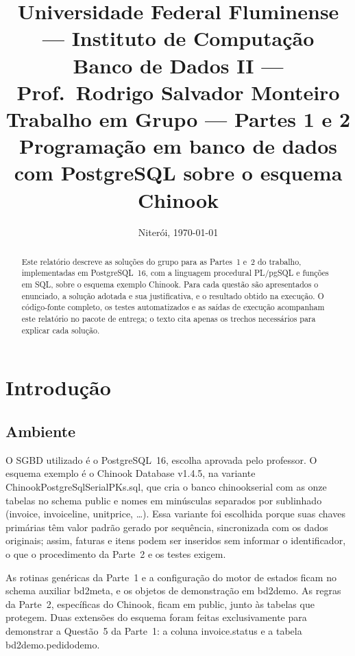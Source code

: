 \documentclass[11pt,a4paper]{article}
\title{%
  \normalsize Universidade Federal Fluminense --- Instituto de Computação\\
  Banco de Dados II --- Prof.\ Rodrigo Salvador Monteiro\\[2.5em]
  \LARGE Trabalho em Grupo --- Partes 1 e 2\\[0.4em]
  \large Programação em banco de dados com PostgreSQL sobre o esquema Chinook}
\author{\integrantes}
\date{Niterói, \today}
\newcommand{\cod}[1]{{\ttfamily\renewcommand{\_}{\textunderscore\allowbreak}#1}}
\begin{document}
\maketitle
\thispagestyle{empty}

\begin{abstract}
\noindent Este relatório descreve as soluções do grupo para as Partes~1 e~2 do trabalho, implementadas em
PostgreSQL~16, com a linguagem procedural PL/pgSQL e funções em SQL, sobre o esquema exemplo Chinook. Para cada questão são
apresentados o enunciado, a solução adotada e sua justificativa, e o resultado obtido na execução. O código-fonte
completo, os testes automatizados e as saídas de execução acompanham este relatório no pacote de entrega; o texto
cita apenas os trechos necessários para explicar cada solução.
\end{abstract}

\tableofcontents

\section{Introdução}

\subsection{Ambiente}

O SGBD utilizado é o PostgreSQL~16, escolha aprovada pelo professor. O esquema exemplo é o Chinook Database
v1.4.5, na variante \cod{Chinook\_PostgreSql\_SerialPKs.sql}, que cria o banco \cod{chinook\_serial} com as onze
tabelas no schema \cod{public} e nomes em minúsculas separados por sublinhado (\cod{invoice}, \cod{invoice\_line},
\cod{unit\_price}, \dots). Essa variante foi escolhida porque suas chaves primárias têm valor padrão gerado por
sequência, sincronizada com os dados originais; assim, faturas e itens podem ser inseridos sem informar o
identificador, o que o procedimento da Parte~2 e os testes exigem.

As rotinas genéricas da Parte~1 e a configuração do motor de estados ficam no schema auxiliar \cod{bd2\_meta},
e os objetos de demonstração em \cod{bd2\_demo}. As regras da Parte~2, específicas do Chinook, ficam em
\cod{public}, junto às tabelas que protegem. Duas extensões do esquema foram feitas exclusivamente para demonstrar a Questão~5 da Parte~1: a
coluna \cod{invoice.status} e a tabela \cod{bd2\_demo.pedido\_demo}.
\end{document}
